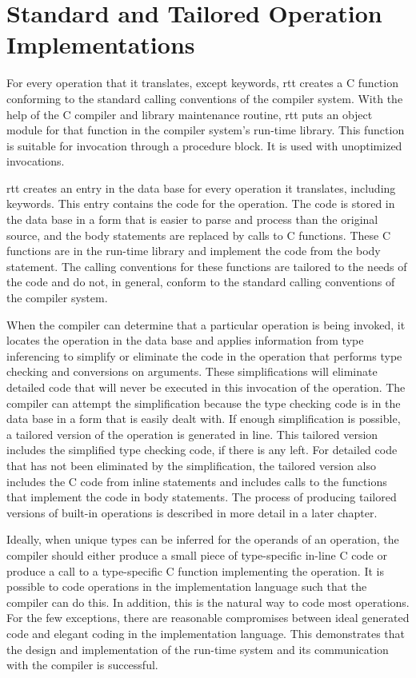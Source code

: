 \section{Standard and Tailored Operation Implementations}

For every operation that it translates, except keywords, rtt creates a
C function conforming to the standard calling conventions of the
compiler system. With the help of the C compiler and library
maintenance routine, rtt puts an object module for that function in
the compiler system's run-time library. This function is suitable for
invocation through a procedure block. It is used with unoptimized
invocations.

rtt creates an entry in the data base for every operation it
translates, including keywords. This entry contains the code for the
operation. The code is stored in the data base in a form that is
easier to parse and process than the original source, and the body
statements are replaced by calls to C functions. These C functions are
in the run-time library and implement the code from the body
statement. The calling conventions for these functions are tailored to
the needs of the code and do not, in general, conform to the standard
calling conventions of the compiler system.

When the compiler can determine that a particular operation is being
invoked, it locates the operation in the data base and applies
information from type inferencing to simplify or eliminate the code in
the operation that performs type checking and conversions on
arguments. These simplifications will eliminate detailed code that
will never be executed in this invocation of the operation. The
compiler can attempt the simplification because the type checking code
is in the data base in a form that is easily dealt with. If enough
simplification is possible, a tailored version of the operation is
generated in line. This tailored version includes the simplified type
checking code, if there is any left.  For detailed code that has not
been eliminated by the simplification, the tailored version also
includes the C code from inline statements and includes calls to the
functions that implement the code in body statements. The process of
producing tailored versions of built-in operations is described in
more detail in a later chapter.

Ideally, when unique types can be inferred for the operands of an
operation, the compiler should either produce a small piece of
type-specific in-line C code or produce a call to a type-specific C
function implementing the operation. It is possible to code operations
in the implementation language such that the compiler can do this. In
addition, this is the natural way to code most operations. For the few
exceptions, there are reasonable compromises between ideal generated
code and elegant coding in the implementation language. This
demonstrates that the design and implementation of the run-time system
and its communication with the compiler is successful.

\section{}
